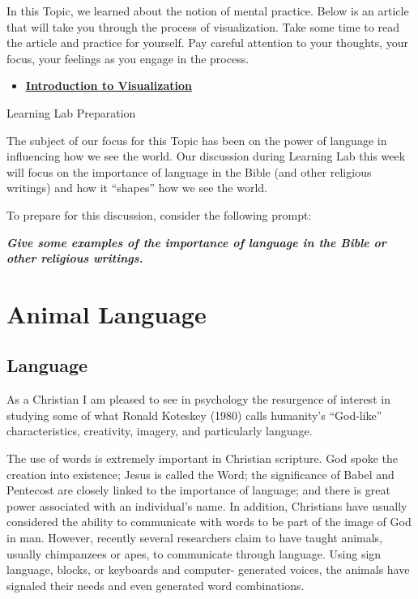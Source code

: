 \documentclass[
]{book}
\providecommand{\tightlist}{%
  \setlength{\itemsep}{0pt}\setlength{\parskip}{0pt}}
\begin{document}
\begin{reflect}
In this Topic, we learned about the notion of mental practice. Below is an article that will take you through the process of visualization. Take some time to read the article and practice for yourself. Pay careful attention to your thoughts, your focus, your feelings as you engage in the process.

\begin{itemize}
\tightlist
\item
  \href{https://www.forbes.com/sites/bhaligill/2017/06/22/new-to-visualization-here-are-5-steps-to-get-you-started/\#60dafcdc6e3f}{\textbf{Introduction to Visualization}}
\end{itemize}

{Learning Lab Preparation}

The subject of our focus for this Topic has been on the power of language in influencing how we see the world. Our discussion during Learning Lab this week will focus on the importance of language in the Bible (and other religious writings) and how it ``shapes'' how we see the world.

To prepare for this discussion, consider the following prompt:

\textbf{\emph{Give some examples of the importance of language in the Bible or other religious writings.}}
\end{reflect}

\hypertarget{animal-language}{%
\section{Animal Language}\label{animal-language}}

\hypertarget{language}{%
\subsection*{Language}\label{language}}

As a Christian I am pleased to see in psychology the resurgence of interest in studying some of what Ronald Koteskey (1980) calls humanity's ``God-like'' characteristics, creativity, imagery, and particularly language.

The use of words is extremely important in Christian scripture. God spoke the creation into existence; Jesus is called the Word; the significance of Babel and Pentecost are closely linked to the importance of language; and there is great power associated with an individual's name. In addition, Christians have usually considered the ability to communicate with words to be part of the image of God in man. However, recently several researchers claim to have taught animals, usually chimpanzees or apes, to communicate through language. Using sign language, blocks, or keyboards and computer- generated voices, the animals have signaled their needs and even generated word combinations.
\end{document}
